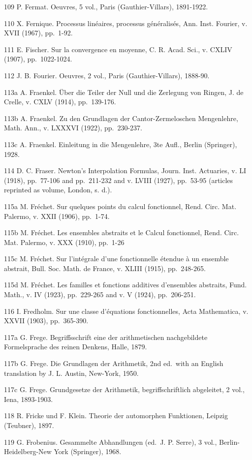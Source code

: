 109 P. Fermat. Oeuvres, 5 vol., Paris (Gauthier-Villars), 1891-1922.

110 X. Fernique. Processus linéaires, processus généralisés, Ann. Inst. Fourier, v. XVII (1967), pp.~1-92.

111 E. Fischer. Sur la convergence en moyenne, C. R. Acad. Sci., v. CXLIV (1907), pp.~1022-1024.

112 J. B. Fourier. Oeuvres, 2 vol., Paris (Gauthier-Villars), 1888-90.

113a A. Fraenkel. Über die Teiler der Null und die Zerlegung von Ringen, J. de Crelle, v. CXLV (1914), pp.~139-176.

113b A. Fraenkel. Zu den Grundlagen der Cantor-Zermeloschen Mengenlehre, Math. Ann., v. LXXXVI (1922), pp.~230-237.

113c A. Fraenkel. Einleitung in die Mengenlehre, 3te Aufl., Berlin (Springer), 1928.

114 D. C. Fraser. Newton's Interpolation Formulas, Journ. Inst. Actuaries, v. LI (1918), pp.~77-106 and pp.~211-232 and v. LVIII (1927), pp.~53-95 (articles reprinted as volume, London, s. d.).

115a M. Fréchet. Sur quelques points du calcul fonctionnel, Rend. Circ. Mat. Palermo, v. XXII (1906), pp.~1-74.

115b M. Fréchet. Les ensembles abstraits et le Calcul fonctionnel, Rend. Circ. Mat. Palermo, v. XXX (1910), pp.~1-26

115c M. Fréchet. Sur l'intégrale d'une fonctionnelle étendue à un ensemble abstrait, Bull. Soc. Math. de France, v. XLIII (1915), pp.~248-265.

115d M. Fréchet. Les familles et fonctions additives d'ensembles abstraits, Fund. Math., v. IV (1923), pp.~229-265 and v. V (1924), pp.~206-251.

116 I. Fredholm. Sur une classe d'équations fonctionnelles, Acta Mathematica, v. XXVII (1903), pp.~365-390.

117a G. Frege. Begriffsschrift eine der arithmetischen nachgebildete Formelsprache des reinen Denkens, Halle, 1879.

117b G. Frege. Die Grundlagen der Arithmetik, 2nd ed.~with an English translation by J. L. Austin, New-York, 1950.

117c G. Frege. Grundgesetze der Arithmetik, begriffschriftlich abgeleitet, 2 vol., Iena, 1893-1903.

118 R. Fricke und F. Klein. Theorie der automorphen Funktionen, Leipzig (Teubner), 1897.

119 G. Frobenius. Gesammelte Abhandlungen (ed.~J. P. Serre), 3 vol., Berlin-Heidelberg-New York (Springer), 1968.


